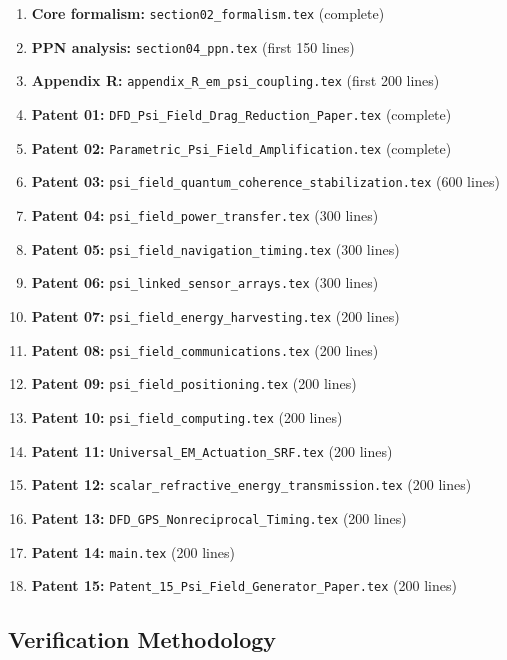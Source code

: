 \documentclass[12pt,a4paper]{article}
\begin{document}
\begin{enumerate}[nosep]
\item \textbf{Core formalism:} \texttt{section02\_formalism.tex} (complete)
\item \textbf{PPN analysis:} \texttt{section04\_ppn.tex} (first 150 lines)
\item \textbf{Appendix R:} \texttt{appendix\_R\_em\_psi\_coupling.tex} (first 200 lines)
\item \textbf{Patent 01:} \texttt{DFD\_Psi\_Field\_Drag\_Reduction\_Paper.tex} (complete)
\item \textbf{Patent 02:} \texttt{Parametric\_Psi\_Field\_Amplification.tex} (complete)
\item \textbf{Patent 03:} \texttt{psi\_field\_quantum\_coherence\_stabilization.tex} (600 lines)
\item \textbf{Patent 04:} \texttt{psi\_field\_power\_transfer.tex} (300 lines)
\item \textbf{Patent 05:} \texttt{psi\_field\_navigation\_timing.tex} (300 lines)
\item \textbf{Patent 06:} \texttt{psi\_linked\_sensor\_arrays.tex} (300 lines)
\item \textbf{Patent 07:} \texttt{psi\_field\_energy\_harvesting.tex} (200 lines)
\item \textbf{Patent 08:} \texttt{psi\_field\_communications.tex} (200 lines)
\item \textbf{Patent 09:} \texttt{psi\_field\_positioning.tex} (200 lines)
\item \textbf{Patent 10:} \texttt{psi\_field\_computing.tex} (200 lines)
\item \textbf{Patent 11:} \texttt{Universal\_EM\_Actuation\_SRF.tex} (200 lines)
\item \textbf{Patent 12:} \texttt{scalar\_refractive\_energy\_transmission.tex} (200 lines)
\item \textbf{Patent 13:} \texttt{DFD\_GPS\_Nonreciprocal\_Timing.tex} (200 lines)
\item \textbf{Patent 14:} \texttt{main.tex} (200 lines)
\item \textbf{Patent 15:} \texttt{Patent\_15\_Psi\_Field\_Generator\_Paper.tex} (200 lines)
\end{enumerate}

\subsection{Verification Methodology}
\end{document}
